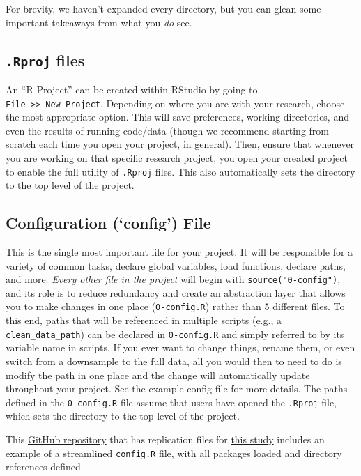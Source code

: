 \documentclass[
]{book}
\begin{document}
For brevity, we haven't expanded every directory, but you can glean some important takeaways from what you \emph{do} see.

\hypertarget{rproj-files}{%
\subsection{\texorpdfstring{\texttt{.Rproj} files}{.Rproj files}}\label{rproj-files}}

An ``R Project'' can be created within RStudio by going to \texttt{File\ \textgreater{}\textgreater{}\ New\ Project}. Depending on where you are with your research, choose the most appropriate option. This will save preferences, working directories, and even the results of running code/data (though we recommend starting from scratch each time you open your project, in general). Then, ensure that whenever you are working on that specific research project, you open your created project to enable the full utility of \texttt{.Rproj} files. This also automatically sets the directory to the top level of the project.

\hypertarget{configuration-config-file}{%
\subsection{Configuration (`config') File}\label{configuration-config-file}}

This is the single most important file for your project. It will be responsible for a variety of common tasks, declare global variables, load functions, declare paths, and more. \emph{Every other file in the project} will begin with \texttt{source("0-config")}, and its role is to reduce redundancy and create an abstraction layer that allows you to make changes in one place (\texttt{0-config.R}) rather than 5 different files. To this end, paths that will be referenced in multiple scripts (e.g., a \texttt{clean\_data\_path}) can be declared in \texttt{0-config.R} and simply referred to by its variable name in scripts. If you ever want to change things, rename them, or even switch from a downsample to the full data, all you would then to need to do is modify the path in one place and the change will automatically update throughout your project. See the example config file for more details. The paths defined in the \texttt{0-config.R} file assume that users have opened the \texttt{.Rproj} file, which sets the directory to the top level of the project.

This \href{https://github.com/jadebc-berkeley/WBB-STH-Kato-Katz}{GitHub repository} that has replication files for \href{https://www.biorxiv.org/content/10.1101/629501v1}{this study} includes an example of a streamlined \texttt{config.R} file, with all packages loaded and directory references defined.
\end{document}
